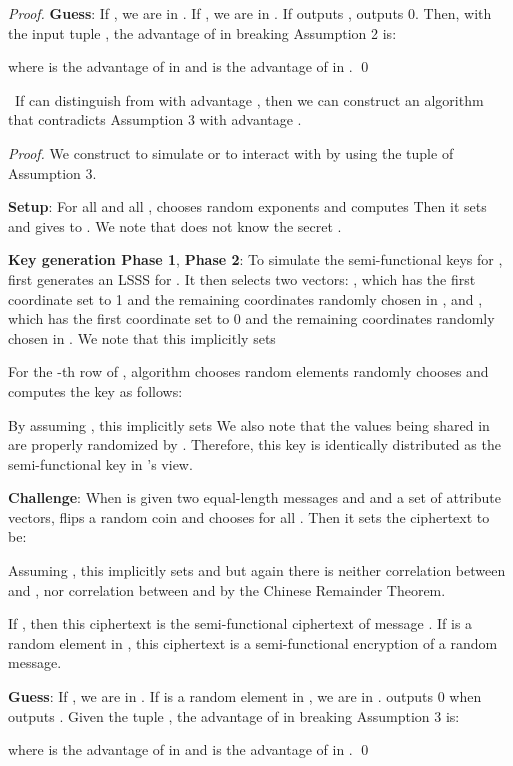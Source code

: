 \documentclass[twocolumn]{svjour3}          \smartqed  \usepackage{graphicx}
\begin{document}
\begin{proof}
\medskip
\noindent\textbf{Guess}: If , we are in . If , we are in . If  outputs
,  outputs 0. Then, with the input tuple , the advantage of  in breaking Assumption 2 is:



\noindent where  is the advantage of  in  and  is the
advantage of  in .
\qed
\end{proof}

\begin{lemma}\label{lem4}~If   can distinguish  from  with advantage , then we can construct an algorithm
 that contradicts Assumption 3 with advantage .
\end{lemma}

\begin{proof} We construct  to simulate  or  to interact with  by using the tuple  of Assumption 3.

\medskip
\noindent\textbf{Setup}: For all  and all ,  chooses random exponents  and computes 
Then it sets
 and gives  to . We note that  does not know
the secret .

\medskip
\noindent\textbf{Key generation Phase 1}, \textbf{Phase 2}: To simulate the semi-functional keys for ,  first generates an LSSS
 for . It then selects two vectors: , which has the first coordinate set to 1 and the remaining 
coordinates randomly chosen in , and , which has the first coordinate set to 0 and the remaining  coordinates randomly
chosen in
. We note that this implicitly sets 

For the -th row  of , algorithm  chooses random elements 
 randomly chooses  and computes the key as follows:

By assuming , this implicitly sets 
We also note that the values being shared in  are properly randomized by . Therefore, this key is identically distributed as the
semi-functional key in 's view.

\medskip
\noindent\textbf{Challenge}: When  is given two equal-length messages  and  and a set  of attribute vectors,  flips a
random coin  and chooses  for all . Then it sets the ciphertext to be:



Assuming , this implicitly sets  and  
but again there is neither correlation between  and , nor correlation between
 and  by the Chinese Remainder Theorem.

If , then this ciphertext is the semi-functional ciphertext of message . If  is a random element in , this
ciphertext is a semi-functional encryption of a random message.

\medskip
\noindent\textbf{Guess}: If , we are in . If  is a random element in , we are in .
 outputs 0 when  outputs . Given the tuple , the advantage of
 in breaking Assumption 3 is:



where  is the advantage of  in  and  is the advantage of
 in .
\qed
\end{proof}
\end{document}

